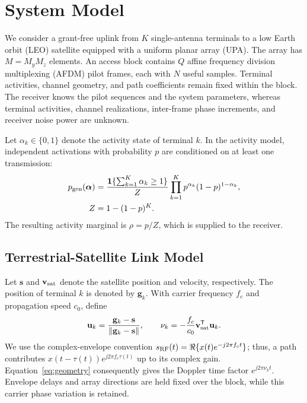 \section{System Model}
\label{sec:system}

We consider a grant-free uplink from $K$ single-antenna terminals to a
low Earth orbit (LEO) satellite equipped with a uniform planar array (UPA).
The array has $M=M_yM_z$ elements. An access block contains $Q$ affine
frequency division multiplexing (AFDM) pilot frames, each with $N$ useful
samples. Terminal activities, channel geometry, and path coefficients
remain fixed within the block.
The receiver knows the pilot sequences and the system parameters,
whereas terminal activities, channel realizations, inter-frame phase
increments, and receiver noise power are unknown.

Let $\alpha_k\in\{0,1\}$ denote the activity state of terminal $k$.
In the activity model, independent activations with
probability $p$ are conditioned on at least one transmission:
\begin{equation}
 \begin{aligned}
 p_{\rm gen}(\bm\alpha)&=
 \frac{\mathbf{1}\{\sum_{k=1}^{K}\alpha_k\geq1\}}{Z}
 \prod_{k=1}^{K}p^{\alpha_k}(1-p)^{1-\alpha_k},\\
 Z&=1-(1-p)^K.
 \end{aligned}
 \label{eq:activity-generation}
\end{equation}
The resulting activity marginal is $\rho=p/Z$, which is supplied to
the receiver.

\subsection{Terrestrial-Satellite Link Model}

Let $\mathbf{s}$ and $\mathbf{v}_{\rm sat}$ denote the satellite position
and velocity, respectively. The position of terminal $k$ is denoted by
$\mathbf{g}_k$.
With carrier frequency $f_c$ and propagation speed $c_0$, define
\begin{equation}
 \mathbf{u}_k=\frac{\mathbf{g}_k-\mathbf{s}}
 {\left\lVert\mathbf{g}_k-\mathbf{s}\right\rVert},
 \qquad
 \nu_k=-\frac{f_c}{c_0}\mathbf{v}_{\rm sat}^{\mathsf T}\mathbf{u}_k.
 \label{eq:geometry}
\end{equation}
We use the complex-envelope convention
$s_{\rm RF}(t)=\Re\{x(t)e^{-j2\pi f_ct}\}$; thus, a path contributes
$x(t-\tau(t))e^{j2\pi f_c\tau(t)}$ up to its complex gain.
Equation~\eqref{eq:geometry} consequently gives the Doppler time factor
$e^{j2\pi\nu_kt}$. Envelope delays and array directions are held fixed
over the block, while this carrier phase variation is retained.

